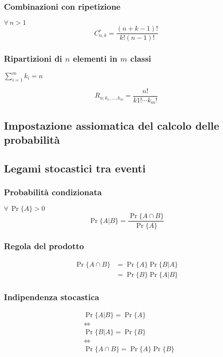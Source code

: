 \documentclass[a4paper,12pt]{article}
\theoremstyle{mystyle}
\begin{document}
\subsubsection{Combinazioni con ripetizione}
\(\forall \, n>1\)
\[
    C_{n,k}^r = \frac{(n+k-1)!}{k!(n-1)!}
\]

\subsubsection{\texorpdfstring{Ripartizioni di \(n\) elementi in \(m\) classi}{Riprtizioni di n elementi in m classi}}
\(\sum_{i=1}^{m} k_i = n\)

\[
    R_{n;k_1,\ldots,k_m} = \frac{n!}{k1! \cdots k_m!}
\]

\subsection{Impostazione assiomatica del calcolo delle probabilità}

\subsection{Legami stocastici tra eventi}
\subsubsection{Probabilità condizionata}
\(\forall \, \Pr\{A\}>0\)
\[
    \Pr\{A|B\} = \frac{\Pr\{A \cap B\}}{\Pr\{A\}}
\]

\subsubsection{Regola del prodotto}
\[
    \begin{aligned}
        \Pr\{A\cap B\}
        &=\Pr\{A\}\Pr\{B|A\} \\
        &=\Pr\{B\}\Pr\{A|B\}
    \end{aligned}
\]

\subsubsection{Indipendenza stocastica}
\[
    \begin{aligned}
        &\Pr\{A|B\} = \Pr\{A\} \\
        &\Leftrightarrow \\
        &\Pr\{B|A\} = \Pr\{B\} \\
        &\Leftrightarrow \\
        &\Pr\{A \cap B\} = \Pr\{A\}\Pr\{B\}
    \end{aligned}
\]
\end{document}
